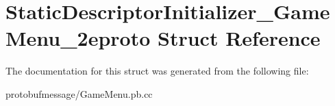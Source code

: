 \hypertarget{struct_static_descriptor_initializer___game_menu__2eproto}{\section{Static\-Descriptor\-Initializer\-\_\-\-Game\-Menu\-\_\-2eproto Struct Reference}
\label{struct_static_descriptor_initializer___game_menu__2eproto}
}


The documentation for this struct was generated from the following file\-:\begin{DoxyCompactItemize}
\item 
protobufmessage/Game\-Menu.\-pb.\-cc\end{DoxyCompactItemize}
